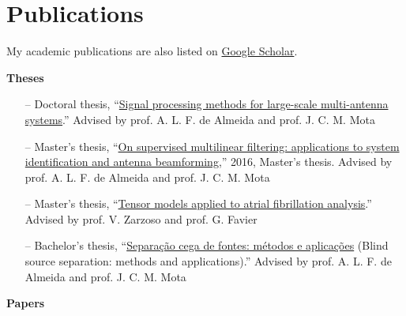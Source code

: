 \section{Publications}

My academic publications are also listed on \href{https://scholar.google.com.br/citations?user=STk6opQAAAAJ}{Google Scholar}.

{\bf Theses}\\

\begin{itemize}
	\item[--] Doctoral thesis, ``\href{http://repositorio.ufc.br/bitstream/riufc/47501/3/2019_tese_lnribeiro.pdf}{Signal processing methods for large-scale multi-antenna systems}.'' Advised by prof. A. L. F. de Almeida and prof. J. C. M. Mota
	\item[--] Master's thesis, ``\href{http://www.repositorio.ufc.br/bitstream/riufc/16516/1/2016_dis_lnribeiro.pdf}{On supervised multilinear filtering: applications to system identification and antenna beamforming},'' 2016, Master's thesis. Advised by prof. A. L. F. de Almeida and prof. J. C. M. Mota
	\item[--] Master's thesis, ``\href{https://github.com/lnribeiro/lnribeiro.github.io/blob/master/assets/pdf/rapport.pdf}{Tensor models applied to atrial fibrillation analysis}.'' Advised by prof. V. Zarzoso and prof. G. Favier
	\item[--] Bachelor's thesis, ``\href{https://github.com/lnribeiro/lnribeiro.github.io/blob/master/assets/pdf/monografia.pdf}{Separação cega de fontes: métodos e aplicações} (Blind source separation: methods and applications).'' Advised by prof. A. L. F. de Almeida and prof. J. C. M. Mota
\end{itemize}

{\bf Papers}\\

